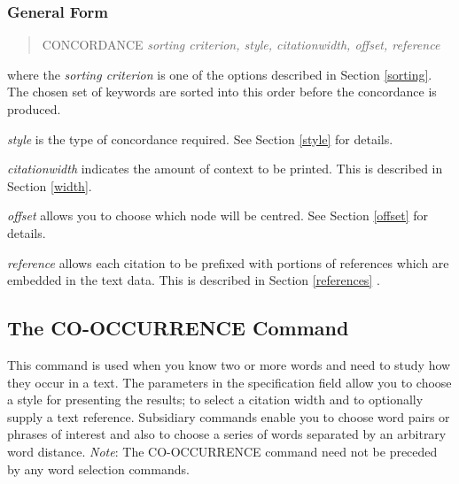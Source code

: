 \subsubsection{General Form}
\begin{quote}
CONCORDANCE   {\em sorting criterion, style, citationwidth, offset, reference}
\end{quote}

where the {\em sorting criterion} is one of the options described
in Section \ref{sorting}.
The chosen set of keywords are sorted into this order before the
concordance is produced.

{\em style} is the type of concordance required.
See Section \ref{style} for details.

{\em citationwidth} indicates the amount of context to be printed. This is
described in Section \ref{width}.

{\em offset} allows you to choose which node will be centred. See Section
\ref{offset} for details.

{\em reference} allows each citation to be prefixed with portions of references
which are embedded in the text data. This is described in Section \ref{references} .

\subsection{The CO-OCCURRENCE Command}
This command is used when you know two or more words and need
to study how they occur in a text.  The parameters in the specification
field allow you to choose a style for presenting the results; to
select a citation width and to optionally supply a text reference.
Subsidiary commands enable you to choose word pairs
or phrases of interest and also to choose a series of words
separated by an arbitrary word distance.  {\em Note}:  The CO-OCCURRENCE
command need not be preceded by any word selection commands.

